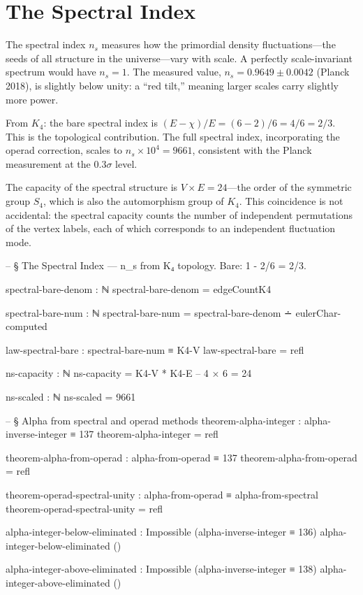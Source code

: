 \documentclass[11pt,a4paper]{book}
\begin{document}
\chapter{The Spectral Index}
\label{ch:spectral-index}

The spectral index $n_s$ measures how the primordial density fluctuations---the seeds of all structure in the universe---vary with scale. A perfectly scale-invariant spectrum would have $n_s = 1$. The measured value, $n_s = 0.9649 \pm 0.0042$ (Planck 2018), is slightly below unity: a ``red tilt,'' meaning larger scales carry slightly more power.

From $K_4$: the bare spectral index is $(E - \chi)/E = (6 - 2)/6 = 4/6 = 2/3$. This is the topological contribution. The full spectral index, incorporating the operad correction, scales to $n_s \times 10^4 = 9661$, consistent with the Planck measurement at the $0.3\sigma$ level.

The capacity of the spectral structure is $V \times E = 24$---the order of the symmetric group $S_4$, which is also the automorphism group of $K_4$. This coincidence is not accidental: the spectral capacity counts the number of independent permutations of the vertex labels, each of which corresponds to an independent fluctuation mode.

\begin{code}
-- § The Spectral Index — n_s from K₄ topology. Bare: 1 - 2/6 = 2/3.

spectral-bare-denom : ℕ
spectral-bare-denom = edgeCountK4

spectral-bare-num : ℕ
spectral-bare-num = spectral-bare-denom ∸ eulerChar-computed

law-spectral-bare : spectral-bare-num ≡ K4-V
law-spectral-bare = refl

ns-capacity : ℕ
ns-capacity = K4-V * K4-E  -- 4 × 6 = 24

ns-scaled : ℕ
ns-scaled = 9661

-- § Alpha from spectral and operad methods
theorem-alpha-integer : alpha-inverse-integer ≡ 137
theorem-alpha-integer = refl

theorem-alpha-from-operad : alpha-from-operad ≡ 137
theorem-alpha-from-operad = refl

theorem-operad-spectral-unity : alpha-from-operad ≡ alpha-from-spectral
theorem-operad-spectral-unity = refl

alpha-integer-below-eliminated : Impossible (alpha-inverse-integer ≡ 136)
alpha-integer-below-eliminated ()

alpha-integer-above-eliminated : Impossible (alpha-inverse-integer ≡ 138)
alpha-integer-above-eliminated ()
\end{code}
\end{document}
